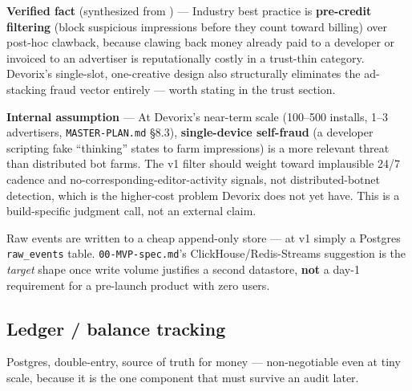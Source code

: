 \textbf{Verified fact} (synthesized from \citep{fraudlogix_2026, humansecurity_2026, atul4u_2026}) --- Industry best practice is \textbf{pre-credit filtering} (block suspicious impressions before they count toward billing) over post-hoc clawback, because clawing back money already paid to a developer or invoiced to an advertiser is reputationally costly in a trust-thin category. Devorix's single-slot, one-creative design also structurally eliminates the ad-stacking fraud vector entirely --- worth stating in the trust section.

\textbf{Internal assumption} --- At Devorix's near-term scale (100--500 installs, 1--3 advertisers, \texttt{MASTER-PLAN.md} \S8.3), \textbf{single-device self-fraud} (a developer scripting fake ``thinking'' states to farm impressions) is a more relevant threat than distributed bot farms. The v1 filter should weight toward implausible 24/7 cadence and no-corresponding-editor-activity signals, not distributed-botnet detection, which is the higher-cost problem Devorix does not yet have. This is a build-specific judgment call, not an external claim.

Raw events are written to a cheap append-only store --- at v1 simply a Postgres \texttt{raw\_events} table. \texttt{00-MVP-spec.md}'s ClickHouse/Redis-Streams suggestion is the \textit{target} shape once write volume justifies a second datastore, \textbf{not} a day-1 requirement for a pre-launch product with zero users.

\subsection{Ledger / balance tracking}
\label{sec:ledger}

Postgres, double-entry, source of truth for money --- non-negotiable even at tiny scale, because it is the one component that must survive an audit later.

